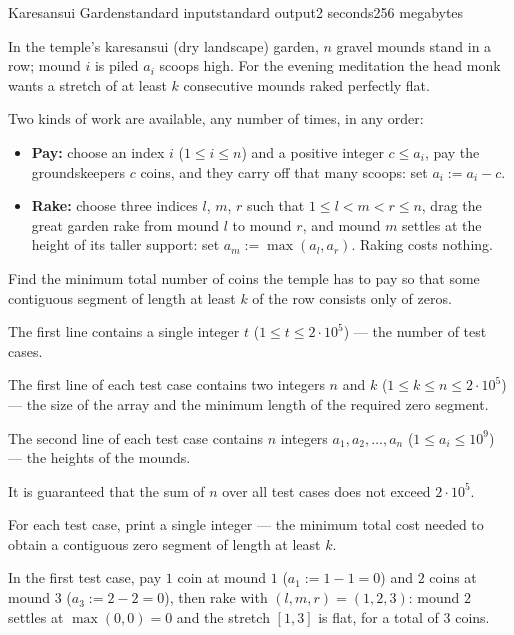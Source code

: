 \begin{problem}{Karesansui Garden}{standard input}{standard output}{2 seconds}{256 megabytes}

In the temple's karesansui (dry landscape) garden, $n$ gravel mounds stand in a row; mound $i$ is piled $a_i$ scoops high. For the evening meditation the head monk wants a stretch of at least $k$ consecutive mounds raked perfectly flat.

Two kinds of work are available, any number of times, in any order:

\begin{itemize}
  \item \textbf{Pay:} choose an index $i$ ($1 \le i \le n$) and a positive integer $c \le a_i$, pay the groundskeepers $c$ coins, and they carry off that many scoops: set $a_i := a_i - c$.
  \item \textbf{Rake:} choose three indices $l$, $m$, $r$ such that $1 \le l < m < r \le n$, drag the great garden rake from mound $l$ to mound $r$, and mound $m$ settles at the height of its taller support: set $a_m := \max(a_l, a_r)$. Raking costs nothing.
\end{itemize}

Find the minimum total number of coins the temple has to pay so that some contiguous segment of length at least $k$ of the row consists only of zeros.


\InputFile
The first line contains a single integer $t$ ($1 \le t \le 2 \cdot 10^5$) --- the number of test cases.

The first line of each test case contains two integers $n$ and $k$ ($1 \le k \le n \le 2 \cdot 10^5$) --- the size of the array and the minimum length of the required zero segment.

The second line of each test case contains $n$ integers $a_1, a_2, \ldots, a_n$ ($1 \le a_i \le 10^9$) --- the heights of the mounds.

It is guaranteed that the sum of $n$ over all test cases does not exceed $2 \cdot 10^5$.


\OutputFile
For each test case, print a single integer --- the minimum total cost needed to obtain a contiguous zero segment of length at least $k$.


\Example

\begin{example}
%
\end{example}

\Note
In the first test case, pay $1$ coin at mound $1$ ($a_1 := 1 - 1 = 0$) and $2$ coins at mound $3$ ($a_3 := 2 - 2 = 0$), then rake with $(l, m, r) = (1, 2, 3)$: mound $2$ settles at $\max(0, 0) = 0$ and the stretch $[1, 3]$ is flat, for a total of $3$ coins.


\end{problem}
